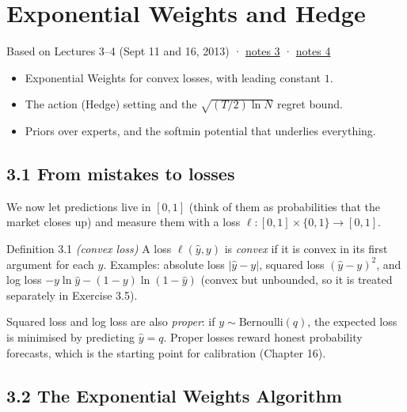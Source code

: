\documentclass[11pt,a4paper,openany]{book}
\newcommand{\abs}[1]{\lvert #1\rvert}
\newcommand{\hy}{\hat{y}}
\newcommand{\chapsource}[1]{{\small\sffamily\color{muted}#1\par}\medskip}
\begin{document}
\chapter[Exponential weights and Hedge]{Exponential Weights and Hedge}\label{ch3}
\chapsource{Based on Lectures 3–4 (Sept 11 and 16, 2013) · \href{https://web.eecs.umich.edu/~jabernet/eecs598course/fall2013/web/notes/lec3_091113.pdf}{notes 3} · \href{https://web.eecs.umich.edu/~jabernet/eecs598course/fall2013/web/notes/lec4_091613.pdf}{notes 4}}

\begin{goals}
\begin{itemize}
\item Exponential Weights for convex losses, with leading constant $1$.
\item The action (Hedge) setting and the $\sqrt{(T/2)\ln N}$ regret bound.
\item Priors over experts, and the softmin potential that underlies everything.
\end{itemize}
\end{goals}

\section*{3.1 From mistakes to losses}\label{ch3-losses}

We now let predictions live in $[0,1]$ (think of them as probabilities that the market closes up) and measure them with a loss $\ell:[0,1]\times\{0,1\}\to[0,1]$.

\begin{bdef}{Definition 3.1 \emph{(convex loss)}}
A loss $\ell(\hy,y)$ is \emph{convex} if it is convex in its first argument for each $y$. Examples: absolute loss $\abs{\hy-y}$, squared loss $(\hy-y)^2$, and log loss $-y\ln\hy-(1-y)\ln(1-\hy)$ (convex but unbounded, so it is treated separately in Exercise 3.5).
\end{bdef}

Squared loss and log loss are also \emph{proper}: if $y\sim\mathrm{Bernoulli}(q)$, the expected loss is minimised by predicting $\hy=q$. Proper losses reward honest probability forecasts, which is the starting point for calibration (Chapter 16).

\section*{3.2 The Exponential Weights Algorithm}\label{ch3-ewa}
\end{document}
